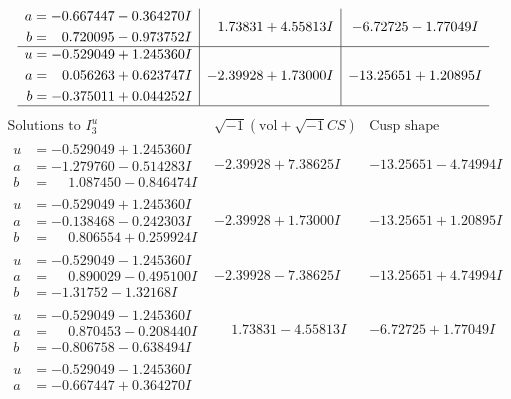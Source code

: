 \documentclass[1p]{elsarticle_modified}
\theoremstyle{definition}
\newcommand{\I}{\sqrt{-1}}
\begin{document}
$$\begin{array}{c|c|c}
\begin{aligned}
a &= -0.667447 - 0.364270 I \\
b &= \phantom{-}0.720095 - 0.973752 I\end{aligned}
 & \phantom{-}1.73831 + 4.55813 I & -6.72725 - 1.77049 I \\ \hline\begin{aligned}
u &= -0.529049 + 1.245360 I \\
a &= \phantom{-}0.056263 + 0.623747 I \\
b &= -0.375011 + 0.044252 I\end{aligned}
 & -2.39928 + 1.73000 I & -13.25651 + 1.20895 I\\
 \hline 
 \end{array}$$\newpage$$\begin{array}{c|c|c}  
\text{Solutions to }I^u_{3}& \I (\text{vol} + \sqrt{-1}CS) & \text{Cusp shape}\\
 \hline 
\begin{aligned}
u &= -0.529049 + 1.245360 I \\
a &= -1.279760 - 0.514283 I \\
b &= \phantom{-}1.087450 - 0.846474 I\end{aligned}
 & -2.39928 + 7.38625 I & -13.25651 - 4.74994 I \\ \hline\begin{aligned}
u &= -0.529049 + 1.245360 I \\
a &= -0.138468 - 0.242303 I \\
b &= \phantom{-}0.806554 + 0.259924 I\end{aligned}
 & -2.39928 + 1.73000 I & -13.25651 + 1.20895 I \\ \hline\begin{aligned}
u &= -0.529049 - 1.245360 I \\
a &= \phantom{-}0.890029 - 0.495100 I \\
b &= -1.31752 - 1.32168 I\end{aligned}
 & -2.39928 - 7.38625 I & -13.25651 + 4.74994 I \\ \hline\begin{aligned}
u &= -0.529049 - 1.245360 I \\
a &= \phantom{-}0.870453 - 0.208440 I \\
b &= -0.806758 - 0.638494 I\end{aligned}
 & \phantom{-}1.73831 - 4.55813 I & -6.72725 + 1.77049 I \\ \hline\begin{aligned}
u &= -0.529049 - 1.245360 I \\
a &= -0.667447 + 0.364270 I \\

\end{aligned}
\end{array}$$
\end{document}
